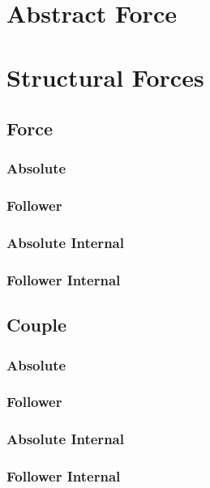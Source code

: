 \section{Abstract Force}

\section{Structural Forces}

\subsection{Force}

\subsubsection{Absolute}

\subsubsection{Follower}

\subsubsection{Absolute Internal}

\subsubsection{Follower Internal}

\subsection{Couple}

\subsubsection{Absolute}

\subsubsection{Follower}

\subsubsection{Absolute Internal}

\subsubsection{Follower Internal}

